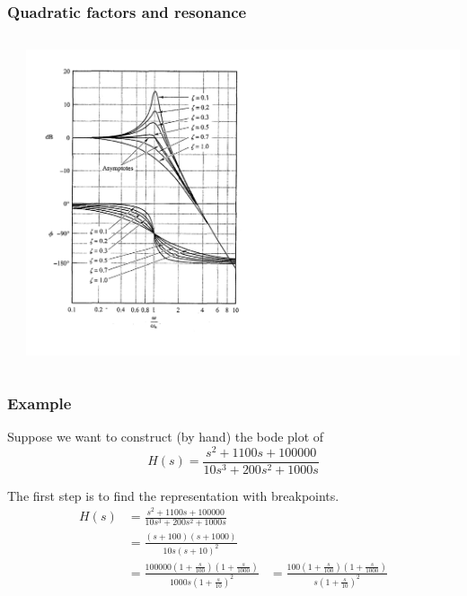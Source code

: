 \begin{frame}
\frametitle{Quadratic factors and resonance}

\begin{columns}
\begin{column}{0.19\textwidth}
\end{column}
\begin{column}{0.81\textwidth}
\includegraphics[scale = 0.35]{Resonance}
\end{column}
\end{columns}


\end{frame}


\begin{frame}
\frametitle{Example}

	Suppose we want to construct (by hand) the bode plot of $$H(s) = \frac{s^2 + 1100s + 100000}{10s^3 + 200s^2 + 1000s}$$
	
	The first step is to find the representation with breakpoints.
	\begin{align*}
	H(s) &=  \frac{s^2 + 1100s + 100000}{10s^3 + 200s^2 + 1000s}\\
	&= \frac{(s+100)(s+1000)}{10s(s+10)^2}\\
	&= \frac{100000(1+\frac{s}{100})(1+\frac{s}{1000})}{1000s(1+\frac{s}{10})^2}
	&= \frac{100(1+\frac{s}{100})(1+\frac{s}{1000})}{s(1+\frac{s}{10})^2}
	\end{align*}



\end{frame}

